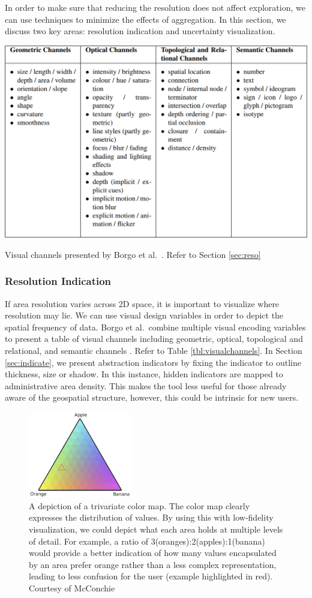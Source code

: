 In order to make sure that reducing the resolution does not affect exploration, we can use techniques to minimize the effects of aggregation. In this section, we discuss two key areas: resolution indication and uncertainty visualization.
\begin{table}[b]
\includegraphics[width=0.7\linewidth]{images/ch7/visualchannels}
\caption{Visual channels presented by Borgo et al.\ \cite{borgo2013glyph}. Refer to Section \ref{sec:reso}} \label{tbl:visualchannels}
\end{table}
\subsubsection*{Resolution Indication} \label{sec:reso}
If area resolution varies across 2D space, it is important to visualize where resolution may lie. We can use visual design variables in order to depict the spatial frequency of data. Borgo et al.\ combine multiple visual encoding variables to present a table of visual channels including geometric, optical, topological and relational, and semantic channels \cite{borgo2013glyph}. Refer to Table \ref{tbl:visualchannels}. In Section \ref{sec:indicate}, we present abstraction indicators by fixing the indicator to outline thickness, size or shadow. In this instance, hidden indicators are mapped to administrative area density. This makes the tool less useful for those already aware of the geospatial structure, however, this could be intrinsic for new users. %

\begin{figure}[t]
\includegraphics[width=0.4\textwidth]{images/ch7/trivariateH}
\caption{A depiction of a trivariate color map. The color map clearly expresses the distribution of values. By using this with low-fidelity visualization, we could depict what each area holds at multiple levels of detail. For example, a ratio of 3(oranges):2(apples):1(banana) would provide a better indication of how many values encapsulated by an area prefer orange rather than a less complex representation, leading to less confusion for the user (example highlighted in red).  Courtesy of McConchie \cite{mcconchie2018pop}} \label{fig:trivariate} %
\end{figure}
